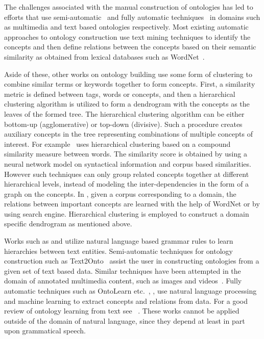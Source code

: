The challenges associated with the manual construction of ontologies has led to efforts that use semi-automatic~\cite{jaimes2003semi} and fully automatic techniques~\cite{buitelaar2005ontology} in domains such as multimedia and text based ontologies respectively. 
Most existing automatic approaches to ontology construction use text mining techniques to identify the concepts and then define relations between the concepts based on their semantic similarity as obtained from lexical databases such as WordNet~\cite{wordnet}.

Aside of these, other works on ontology building use some form of clustering to combine similar terms or keywords together to form concepts.  First, a similarity metric is defined between tags, words or concepts, and then a hierarchical clustering algorithm is utilized to form a dendrogram with the concepts as the leaves of the formed tree. The hierarchical clustering algorithm can be either bottom-up (agglomerative) or top-down (divisive). Such a procedure creates auxiliary concepts in the tree representing combinations of multiple concepts of interest. For example~\cite{neshati2007taxonomy} uses hierarchical clustering based on a compound similarity measure between words. The similarity score is obtained by using a neural network model on syntactical information and corpus based similarities. However such techniques can only group related concepts together at different hierarchical levels, instead of modeling the inter-dependencies in the form of a graph on the concepts. 
In \cite{dietz2012taxolearn}, given a corpus corresponding to a domain, the relations between important concepts are learned with the help of WordNet or by using search engine. Hierarchical clustering is employed to construct a domain specific dendrogram as mentioned above.

Works such as \cite{hearst1992automatic}  and \cite{cimiano2005learning} utilize natural language based grammar rules to learn hierarchies between text entities. Semi-automatic techniques for ontology construction such as Text2Onto~\cite{cimiano2005text2onto} assist the user in constructing ontologies from a given set of text based data. Similar techniques have been attempted in the domain of annotated multimedia content, such as images and videos~\cite{jaimes2003semi}. Fully automatic techniques such as OntoLearn etc.~\cite{velardi2005evaluation}, \cite{navigli2003ontology}, \cite{mani2004automatically} use natural language processing and machine learning to extract concepts and relations from data. For a good review of ontology learning from text see ~\cite{buitelaar2005ontology}.  These works cannot be applied outside of the domain of natural language, since they depend at least in part upon grammatical speech. 


